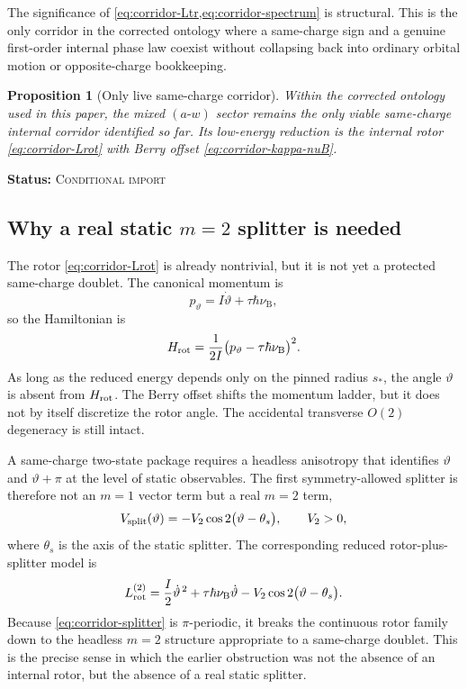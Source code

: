 \documentclass[11pt]{article}
\theoremstyle{plain}
\newtheorem{proposition}[theorem]{Proposition}
\theoremstyle{definition}
\theoremstyle{remark}
\newcommand{\statusConditional}{\textsc{Conditional import}}
\newcommand{\claimstatus}[1]{\par\smallskip\noindent\textbf{Status:} #1\par\smallskip}
\newcommand{\nuB}{\nu_{\mathrm{B}}}
\newcommand{\throt}{\vartheta}
\begin{document}
The significance of \cref{eq:corridor-Ltr,eq:corridor-spectrum} is structural. This is the only corridor in the corrected ontology where a same-charge sign and a genuine first-order internal phase law coexist without collapsing back into ordinary orbital motion or opposite-charge bookkeeping.

\begin{proposition}[Only live same-charge corridor]\label{prop:corridor-only-live}
Within the corrected ontology used in this paper, the mixed $(a\text{-}w)$ sector remains the only viable same-charge internal corridor identified so far. Its low-energy reduction is the internal rotor \cref{eq:corridor-Lrot} with Berry offset \cref{eq:corridor-kappa-nuB}.
\end{proposition}
\claimstatus{\statusConditional}

\subsection{Why a real static \texorpdfstring{$m=2$}{m=2} splitter is needed}\label{subsec:corridor-need-splitter}

The rotor \cref{eq:corridor-Lrot} is already nontrivial, but it is not yet a protected same-charge doublet. The canonical momentum is
\begin{equation}
p_{\throt}=I\dot\throt+\tau\hbar\nuB,
\label{eq:corridor-canonical-momentum}
\end{equation}
so the Hamiltonian is
\begin{equation}
H_{\rm rot}
=
\frac{1}{2I}\bigl(p_{\throt}-\tau\hbar\nuB\bigr)^2.
\label{eq:corridor-Hrot}
\end{equation}
As long as the reduced energy depends only on the pinned radius $s_*$, the angle $\throt$ is absent from $H_{\rm rot}$. The Berry offset shifts the momentum ladder, but it does not by itself discretize the rotor angle. The accidental transverse $O(2)$ degeneracy is still intact.

A same-charge two-state package requires a headless anisotropy that identifies $\throt$ and $\throt+\pi$ at the level of static observables. The first symmetry-allowed splitter is therefore not an $m=1$ vector term but a real $m=2$ term,
\begin{equation}
V_{\rm split}(\throt)
=
-V_2\cos 2\bigl(\throt-\theta_s\bigr),
\qquad V_2>0,
\label{eq:corridor-splitter}
\end{equation}
where $\theta_s$ is the axis of the static splitter. The corresponding reduced rotor-plus-splitter model is
\begin{equation}
L_{\rm rot}^{(2)}
=
\frac{I}{2}\dot\throt^{\,2}+\tau\hbar\nuB\dot\throt
-V_2\cos 2\bigl(\throt-\theta_s\bigr).
\label{eq:corridor-Lrot-split}
\end{equation}
Because \cref{eq:corridor-splitter} is $\pi$-periodic, it breaks the continuous rotor family down to the headless $m=2$ structure appropriate to a same-charge doublet. This is the precise sense in which the earlier obstruction was not the absence of an internal rotor, but the absence of a real static splitter.
\end{document}
